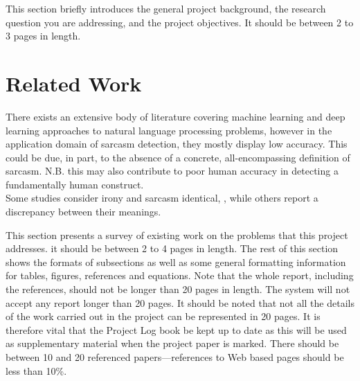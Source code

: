 \documentclass[12pt,a4paper]{article}
\begin{document}
This section briefly introduces the general project background, the research question you are addressing, and the project objectives.  It should be between 2 to 3 pages in length.\\



\section{Related Work}
\noindent There exists an extensive body of literature covering machine learning and deep learning approaches to natural language processing problems, however in the application domain of sarcasm detection, they mostly display low accuracy. This could be due, in part, to the absence of a concrete, all-encompassing definition of sarcasm. N.B. this may also contribute to poor human accuracy in detecting a fundamentally human construct. \\

Some studies consider irony and sarcasm identical,  \cite{}, while others report a discrepancy between their meanings. 



This section presents a survey of existing work on the problems that this project addresses.  it should be between 2 to 4 pages in length.  The rest of this section shows the formats of subsections as well as some general formatting information for tables, figures, references and equations. Note that the whole report, including the references, should not be longer than 20 pages in length.  The system will not accept any report longer than 20 pages.  It should be noted that not all the details of the work carried out in the project can be represented in 20 pages.  It is therefore vital that the Project Log book be kept up to date as this will be used as supplementary material when the project paper is marked.  There should be between 10 and 20 referenced papers---references to Web based pages should be less than 10\%.
\end{document}
